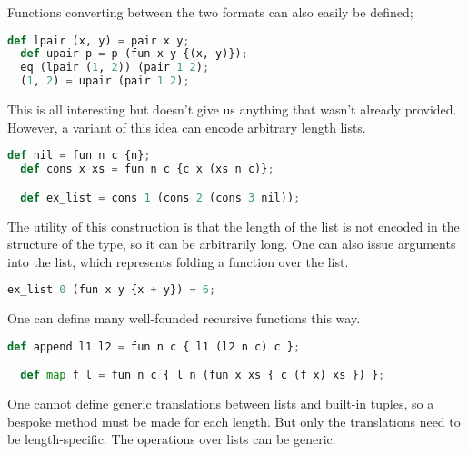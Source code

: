 Functions converting between the two formats can also easily be defined;

\begin{lstlisting}[language=Python]
  def lpair (x, y) = pair x y;
  def upair p = p (fun x y {(x, y)});
  eq (lpair (1, 2)) (pair 1 2);
  (1, 2) = upair (pair 1 2);
\end{lstlisting}

This is all interesting but doesn't give us anything that wasn't already provided. However, a variant of this idea can encode arbitrary length lists.

\begin{lstlisting}[language=Python]
  def nil = fun n c {n};
  def cons x xs = fun n c {c x (xs n c)};

  def ex_list = cons 1 (cons 2 (cons 3 nil));
\end{lstlisting}

The utility of this construction is that the length of the list is not encoded in the structure of the type, so it can be arbitrarily long. One can also issue arguments into the list, which represents folding a function over the list.

\begin{lstlisting}[language=Python]
  ex_list 0 (fun x y {x + y}) = 6;
\end{lstlisting}

One can define many well-founded recursive functions this way.

\begin{lstlisting}[language=Python]
  def append l1 l2 = fun n c { l1 (l2 n c) c };

  def map f l = fun n c { l n (fun x xs { c (f x) xs }) };
\end{lstlisting}

One cannot define generic translations between lists and built-in tuples, so a bespoke method must be made for each length. But only the translations need to be length-specific. The operations over lists can be generic.

